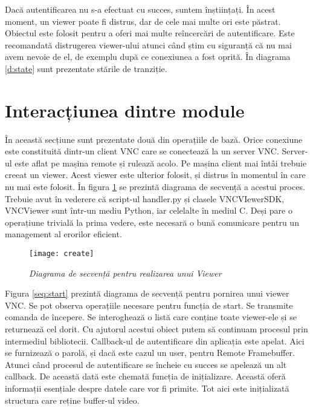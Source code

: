 Dacă autentificarea nu s-a efectuat cu succes, suntem înștiințați. În acest moment, un viewer poate fi distrus, dar de cele mai multe ori este păstrat. Obiectul este folosit pentru a oferi mai multe reîncercări de autentificare. Este recomandată distrugerea viewer-ului atunci când știm cu siguranță că nu mai avem nevoie de el, de exemplu după ce conexiunea a fost oprită. În diagrama \ref{d:state} sunt prezentate stările de tranziție.



\section{Interacțiunea dintre module}


În această secțiune sunt prezentate două din operațiile de bază. Orice conexiune este constituită dintr-un client VNC care se conectează la un server VNC. Server-ul este aflat pe mașina remote și rulează acolo. Pe mașina client mai întâi trebuie creeat un viewer. Acest viewer este ulterior folosit, și distrus în momentul în care nu mai este folosit. În figura \ref{seq:create} se prezintă diagrama de secvență a acestui proces. Trebuie avut în vederere că script-ul handler.py și clasele VNCVIewerSDK, VNCViewer sunt într-un mediu Python, iar celelalte în mediul C. Deși pare o operațiune trivială la prima vedere, este necesară o bună comunicare pentru un management al erorilor eficient.

\begin{figure}
    \centering
    \texttt{[image: create]}
    \caption{\textit{Diagrama de secvență pentru realizarea unui Viewer}}
    \label{seq:create}
\end{figure}


Figura \ref{seq:start} prezintă diagrama de secvență pentru pornirea unui viewer VNC. Se pot observa operațiile necesare pentru funcția de start. Se transmite comanda de începere. Se interoghează o listă care conține toate viewer-ele și se returnează cel dorit. Cu ajutorul acestui obiect putem să continuam procesul prin intermediul bibliotecii. Callback-ul de autentificare din aplicația este apelat. Aici se furnizează o parolă, și dacă este cazul un user, pentru Remote Framebuffer. Atunci când procesul de autentificare se încheie cu succes se apelează un alt callback. De această dată este chemată funcția de inițializare. Această oferă informații esențiale despre datele care vor fi primite. Tot aici este inițializată structura care reține buffer-ul video.

